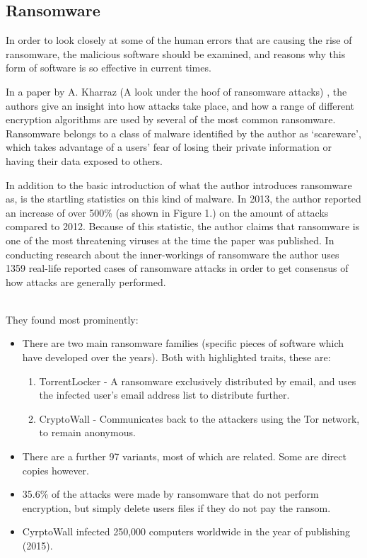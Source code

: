 \documentclass[journal,comsoc]{IEEEtran}
\begin{document}
\subsection{Ransomware}In order to look closely at some of the human errors that are causing the rise of ransomware, the malicious software should be examined, and reasons why this form of software is so effective in current times. \par
In a paper by A. Kharraz (A look under the hoof of ransomware attacks) \cite{paper4}, the authors give an insight into how attacks take place, and how a range of different encryption algorithms are used by several of the most common ransomware. Ransomware belongs to a class of malware identified by the author as ‘scareware’, which takes advantage of a users’ fear of losing their private information or having their data exposed to others. \par
In addition to the basic introduction of what the author introduces ransomware as, is the startling statistics on this kind of malware. In 2013, the author reported an increase of over 500\% (as shown in Figure 1.) on the amount of attacks compared to 2012. Because of this statistic, the author claims that ransomware is one of the most threatening viruses at the time the paper was published. In conducting research about the inner-workings of ransomware the author uses 1359 real-life reported cases of ransomware attacks in order to get consensus of how attacks are generally performed. \par
[IMAGE OF INCREASE]
\\
They found most prominently:
\begin{itemize}
\item There are two main ransomware families (specific pieces of software which have developed over the years). Both with highlighted traits, these are:
\begin{enumerate}
\item TorrentLocker - A ransomware exclusively distributed by email, and uses the infected user’s email address list to distribute further.
\item CryptoWall - Communicates back to the attackers using the Tor network, to remain anonymous.
\end{enumerate}
\item There are a further 97 variants, most of which are related. Some are direct copies however.
\item 35.6\% of the attacks were made by ransomware that do not perform encryption, but simply delete users files if they do not pay the ransom.
\item CyrptoWall infected 250,000 computers worldwide in the year of publishing (2015).
\end{itemize}
\end{document}
